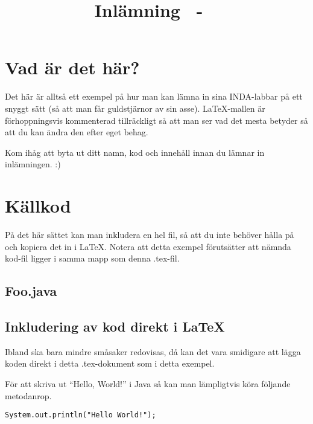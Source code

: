 \documentclass[a4paper,10pt,twoside]{article}
\title{Inlämning \homeworknumber\ - \course\ \coursename}
\date{\thedate}
\author{\theauthor}
\begin{document}


\setcounter{page}{1}


\section{Vad är det här?}
\label{sec:vad_är_det_här}

Det här är alltså ett exempel på hur man kan lämna in sina INDA-labbar på ett snyggt sätt (så att man får guldstjärnor av sin asse). \LaTeX-mallen är förhoppningsvis kommenterad tillräckligt så att man ser vad det mesta betyder så att du kan ändra den efter eget behag. 

Kom ihåg att byta ut ditt namn, kod och innehåll innan du lämnar in inlämningen. :)

\section{Källkod}
\label{sec:källkod}

På det här sättet kan man inkludera en hel fil, så att du inte behöver hålla på och kopiera det in i \LaTeX. Notera att detta exempel förutsätter att nämnda kod-fil ligger i samma mapp som denna .tex-fil. 

\subsection{Foo.java}
\label{sec:Foo_java} %

\subsection{Inkludering av kod direkt i \LaTeX}

Ibland ska bara mindre småsaker redovisas, då kan det vara smidigare att lägga koden direkt i detta .tex-dokument som i detta exempel.

För att skriva ut ``Hello, World!'' i Java så kan man lämpligtvis köra följande metodanrop.

\begin{lstlisting}
System.out.println("Hello World!");
\end{lstlisting}
\end{document}
